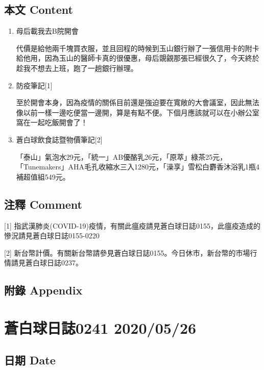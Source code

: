 \documentclass[a5paper, 11pt
]{book}
\begin{document}
\hypertarget{ux672cux6587-content-85}{%
\subsection{本文 Content}\label{ux672cux6587-content-85}}

\begin{enumerate}
\def\labelenumi{\arabic{enumi}.}
\item
  母后載我去B院開會

  代價是給他兩千塊買衣服，並且回程的時候到玉山銀行辦了一張信用卡的附卡給他用，因為玉山的醫師卡真的很優惠，母后覬覦那張已經很久了，今天終於趁我不想去上班，跑了一趟銀行辦理。
\item
  防疫筆記{[}1{]}

  至於開會本身，因為疫情的關係目前還是強迫要在寬敞的大會議室，因此無法像以前一樣一邊吃便當一邊開，算是有點不便。下個月應該就可以在小辦公室窩在一起吃飯開會了！
\item
  蒼白球飲食誌暨物價筆記{[}2{]}

  「泰山」氣泡水29元，「統一」AB優酪乳26元，「原萃」綠茶25元，「Tunemakers」AHA毛孔收縮水三入1280元，「澡享」雪松白麝香沐浴乳1瓶4補超值組549元。
\end{enumerate}

\hypertarget{ux6ce8ux91cb-comment-85}{%
\subsection{注釋 Comment}\label{ux6ce8ux91cb-comment-85}}

{[}1{]}
指武漢肺炎(COVID-19)疫情，有關此瘟疫請見蒼白球日誌0155，此瘟疫造成的慘況請見蒼白球日誌0155-0220

{[}2{]}
新台幣計價。有關新台幣請參見蒼白球日誌0155。今日休市，新台幣的市場行情請見蒼白球日誌0237。

\hypertarget{ux9644ux9304-appendix-85}{%
\subsection{附錄 Appendix}\label{ux9644ux9304-appendix-85}}

\hypertarget{ux84bcux767dux7403ux65e5ux8a8c0241-20200526}{%
\section{蒼白球日誌0241
2020/05/26}\label{ux84bcux767dux7403ux65e5ux8a8c0241-20200526}}

\hypertarget{ux65e5ux671f-date-86}{%
\subsection{日期 Date}\label{ux65e5ux671f-date-86}}
\end{document}
